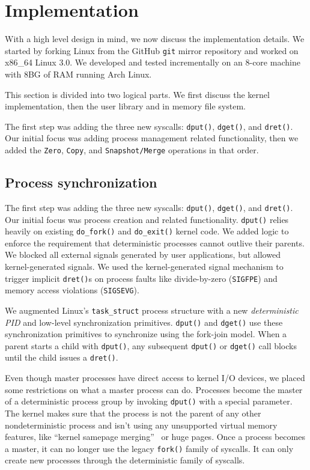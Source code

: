 
\section{Implementation}

With a high level design in mind, we now discuss the implementation details.
We started by forking Linux from the GitHub {\tt git} mirror repository and
worked on x86\_64 Linux 3.0. We developed and tested incrementally on an 8-core
machine with 8BG of RAM running Arch Linux.

This section is divided into two logical parts. We first discuss the kernel
implementation, then the user library and in memory file system.

The first step was adding the three new syscalls: {\tt dput()}, {\tt dget()},
and {\tt dret()}. Our initial focus was adding process management related
functionality, then we added the {\tt Zero}, {\tt Copy}, and
{\tt Snapshot/Merge} operations in that order.

\subsection{Process synchronization}

The first step was adding the three new syscalls: {\tt dput()}, {\tt dget()},
and {\tt dret()}. Our initial focus was process creation and related
functionality. {\tt dput()} relies heavily on existing {\tt do\_fork()} and
{\tt do\_exit()} kernel code.
We added logic to enforce the requirement that deterministic processes cannot
outlive their parents. We blocked all external signals generated by user
applications, but allowed kernel-generated signals. We used the kernel-generated
signal mechanism to trigger implicit {\tt dret()}s on process faults like
divide-by-zero ({\tt SIGFPE}) and memory access violations ({\tt SIGSEVG}).

We augmented Linux's {\tt task\_struct} process structure with a new
\emph{deterministic PID} and low-level synchronization primitives. {\tt dput()}
and {\tt dget()} use these synchronization primitives to synchronize using the
fork-join model. When a parent starts a child
with {\tt dput()}, any subsequent {\tt dput()} or {\tt dget()} call blocks until
the child issues a {\tt dret()}.

Even though master processes have direct access to kernel I/O devices, we placed
some restrictions on what a master process can do. Processes
become the master of a deterministic process group by invoking {\tt dput()} with
a special parameter. The kernel makes sure that the process is not the parent of
any other nondeterministic process and isn't using any
unsupported virtual memory features, like ``kernel samepage
merging''~\cite{arcangeli2009increasing} or huge pages. Once a process
becomes a master, it can no longer use the legacy {\tt fork()} family of
syscalls. It can only create new processes through the deterministic family
of syscalls.

